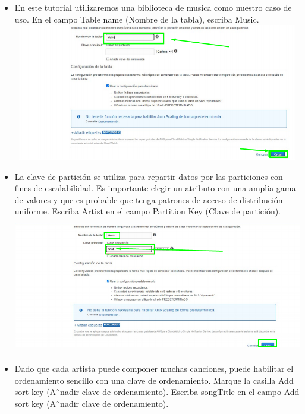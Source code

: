 \documentclass[12pt,a4paper,oneside]{book}
\begin{document}
	\newpage
	\begin{itemize}
		\item {En este tutorial utilizaremos una biblioteca de musica como nuestro caso de uso. En el campo Table name (Nombre de la tabla), escriba Music.
}\\
		
		\includegraphics[width=16cm, height=6cm]{img/3.png}\\
		
		\item {La clave de partición se utiliza para repartir datos por las particiones con fines de escalabilidad. Es importante elegir un atributo con una amplia gama de valores y que es probable que tenga patrones de acceso de distribución uniforme. Escriba Artist en el campo Partition Key (Clave de partición).
}\\
		
		\includegraphics[width=16cm, height=6cm]{img/4.png}\\
		
		\item {Dado que cada artista puede componer muchas canciones, puede habilitar el ordenamiento sencillo con una clave de ordenamiento. Marque la casilla Add sort key (A˜nadir clave de ordenamiento). Escriba songTitle en el campo Add sort key (A˜nadir clave de ordenamiento).
}\\
		

\end{itemize}
\end{document}
